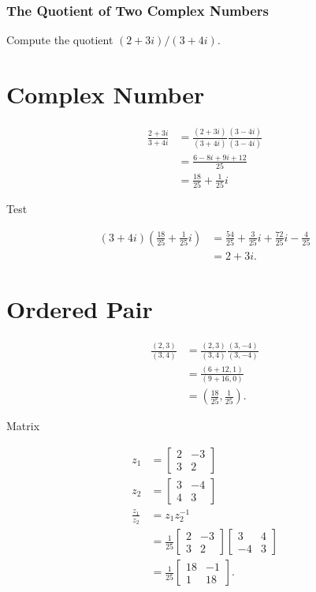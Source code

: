 \documentclass[10pt]{article}
\begin{document}
\subsubsection{The Quotient of Two Complex Numbers}
Compute the quotient $(2+3 i) /(3+4 i)$.

\section{Complex Number}
$$
\begin{aligned}
\frac{2+3 i}{3+4 i} & =\frac{(2+3 i)}{(3+4 i)} \frac{(3-4 i)}{(3-4 i)} \\
& =\frac{6-8 i+9 i+12}{25} \\
& =\frac{18}{25}+\frac{1}{25} i
\end{aligned}
$$

Test

$$
\begin{aligned}
(3+4 i)\left(\frac{18}{25}+\frac{1}{25} i\right) & =\frac{54}{25}+\frac{3}{25} i+\frac{72}{25} i-\frac{4}{25} \\
& =2+3 i .
\end{aligned}
$$

\section{Ordered Pair}
$$
\begin{aligned}
\frac{(2,3)}{(3,4)} & =\frac{(2,3)}{(3,4)} \frac{(3,-4)}{(3,-4)} \\
& =\frac{(6+12,1)}{(9+16,0)} \\
& =\left(\frac{18}{25}, \frac{1}{25}\right) .
\end{aligned}
$$

Matrix

$$
\begin{aligned}
z_{1} & =\left[\begin{array}{cc}
2 & -3 \\
3 & 2
\end{array}\right] \\
z_{2} & =\left[\begin{array}{cc}
3 & -4 \\
4 & 3
\end{array}\right] \\
\frac{z_{1}}{z_{2}} & =z_{1} z_{2}^{-1} \\
& =\frac{1}{25}\left[\begin{array}{cc}
2 & -3 \\
3 & 2
\end{array}\right]\left[\begin{array}{cc}
3 & 4 \\
-4 & 3
\end{array}\right] \\
& =\frac{1}{25}\left[\begin{array}{cc}
18 & -1 \\
1 & 18
\end{array}\right] .
\end{aligned}
$$
\end{document}
